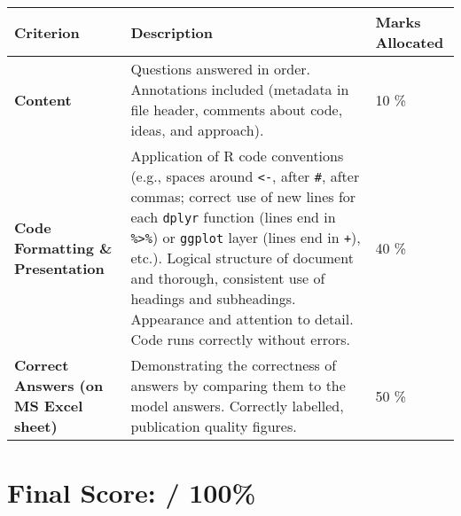 \documentclass[a4paper,10pt]{article}
\begin{document}
{\small
\begin{longtable}{R{3.5cm} R{8.5cm} R{3cm}}
    \toprule
    \textbf{Criterion} & \textbf{Description} & \textbf{Marks Allocated} \\
    \midrule
    \textbf{Content} & Questions answered in order. Annotations included (metadata in file header, comments about code, ideas, and approach). & 10 \% \\
    \textbf{Code Formatting \& Presentation} & Application of R code conventions (e.g., spaces around \texttt{<-}, after \texttt{\#}, after commas; correct use of new lines for each \texttt{dplyr} function (lines end in \texttt{\%>\%}) or \texttt{ggplot} layer (lines end in \texttt{+}), etc.). Logical structure of document and thorough, consistent use of headings and subheadings. Appearance and attention to detail. Code runs correctly without errors. & 40 \% \\
    \textbf{Correct Answers (on MS Excel sheet)} & Demonstrating the correctness of answers by comparing them to the model answers. Correctly labelled, publication quality figures. & 50 \% \\
    \bottomrule
\end{longtable}}

\section*{Final Score: \underline{\hspace{2cm}} / 100\%}
\end{document}
